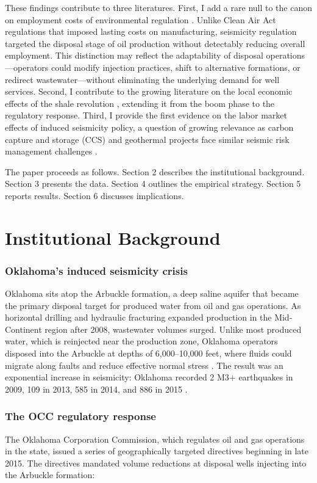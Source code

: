 \documentclass[12pt]{article}
\begin{document}
These findings contribute to three literatures. First, I add a rare null to the canon on employment costs of environmental regulation \citep{greenstone2002, walker2013, curtis2018}. Unlike Clean Air Act regulations that imposed lasting costs on manufacturing, seismicity regulation targeted the disposal stage of oil production without detectably reducing overall employment. This distinction may reflect the adaptability of disposal operations---operators could modify injection practices, shift to alternative formations, or redirect wastewater---without eliminating the underlying demand for well services. Second, I contribute to the growing literature on the local economic effects of the shale revolution \citep{feyrer2017, bartik2019, allcott2018}, extending it from the boom phase to the regulatory response. Third, I provide the first evidence on the labor market effects of induced seismicity policy, a question of growing relevance as carbon capture and storage (CCS) and geothermal projects face similar seismic risk management challenges \citep{ellsworth2013}.

The paper proceeds as follows. Section 2 describes the institutional background. Section 3 presents the data. Section 4 outlines the empirical strategy. Section 5 reports results. Section 6 discusses implications.


\section{Institutional Background}

\subsubsection*{Oklahoma's induced seismicity crisis} Oklahoma sits atop the Arbuckle formation, a deep saline aquifer that became the primary disposal target for produced water from oil and gas operations. As horizontal drilling and hydraulic fracturing expanded production in the Mid-Continent region after 2008, wastewater volumes surged. Unlike most produced water, which is reinjected near the production zone, Oklahoma operators disposed into the Arbuckle at depths of 6,000--10,000 feet, where fluids could migrate along faults and reduce effective normal stress \citep{keranen2014, walsh2009}. The result was an exponential increase in seismicity: Oklahoma recorded 2 M3+ earthquakes in 2009, 109 in 2013, 585 in 2014, and 886 in 2015 \citep{rubinstein2015}.

\subsubsection*{The OCC regulatory response} The Oklahoma Corporation Commission, which regulates oil and gas operations in the state, issued a series of geographically targeted directives beginning in late 2015. The directives mandated volume reductions at disposal wells injecting into the Arbuckle formation:
\end{document}
